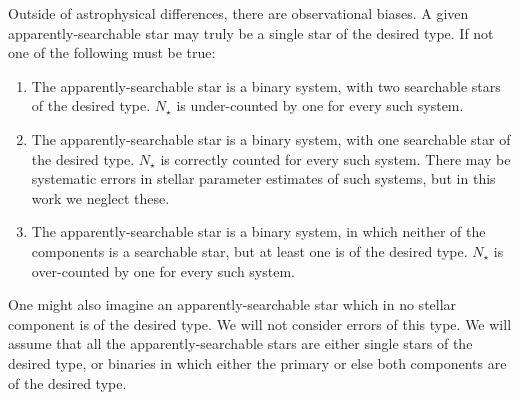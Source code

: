 Outside of astrophysical differences, there are observational biases.
A given apparently-searchable star may truly be a single star of the desired 
type. If not one of the following must be true:
\begin{enumerate}	
    \item The apparently-searchable star is a binary system, with two 
    searchable 
    stars of the desired type. $N_\star$ is under-counted by one for every 
    such 
    system.
    \item The apparently-searchable star is a binary system, with one 
    searchable star of the desired type. 
    $N_\star$ is correctly counted for every such system.
    There may be systematic errors in stellar parameter estimates of such 
    systems, but in this work we neglect these.
    \item  The apparently-searchable star is a binary system, in which neither 
    of the components is a searchable star, but at least one is of the desired 
    type. 
    $N_\star$ is over-counted by one for every such system.
\end{enumerate}

One might also imagine an apparently-searchable star which in no stellar 
component is of the desired type.
We will not consider errors of this type.  We will assume that all the 
apparently-searchable stars are either single stars of
the desired type, or binaries in which either the primary or else both 
components are of the desired type.

